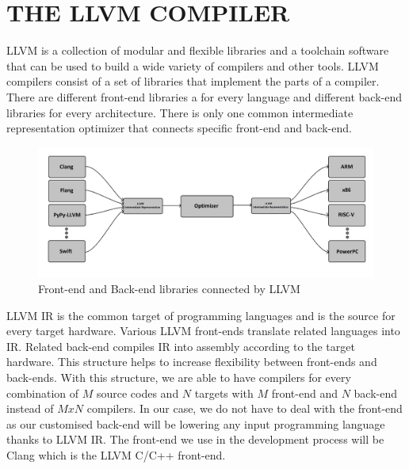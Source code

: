 \clearpage
\chapter{THE LLVM COMPILER}\label{ch:Ch3}

LLVM is a collection of modular and flexible libraries and a toolchain software that can be used to build a wide variety of compilers and other tools. LLVM compilers consist of a set of libraries that implement the parts of a compiler. There are different front-end libraries a for every language and different back-end libraries for every architecture. There is only one common intermediate representation optimizer that connects specific front-end and back-end.

\begin{figure}
    \centering
    \includegraphics{the_llvm_compiler/llvm_diagram.png}
    \caption{Front-end and Back-end libraries connected by LLVM}
    \label{fig:llvm_diagram}
\end{figure}

LLVM IR is the common target of programming languages and is the source for every target hardware. Various LLVM front-ends translate related languages into IR. Related back-end compiles IR into assembly according to the target hardware. This structure helps to increase flexibility between front-ends and back-ends. With this structure, we are able to have compilers for every combination of $M$ source codes and $N$ targets with $M$ front-end and $N$ back-end instead of $MxN$ compilers. In our case, we do not have to deal with the front-end as our customised back-end will be lowering any input programming language thanks to LLVM IR. The front-end we use in the development process will be Clang which is the LLVM C/C++ front-end\cite{clang}.

